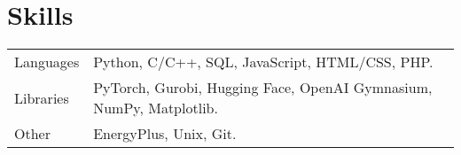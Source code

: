 \documentclass[a4paper,12pt]{article}
\begin{document}
\section{Skills}
\begin{tabularx}{\linewidth}{@{}l X@{}}
Languages & \normalsize{Python, C/C++, SQL, JavaScript, HTML/CSS, PHP.} \\ %
Libraries & \normalsize{PyTorch, Gurobi, Hugging Face, OpenAI Gymnasium, NumPy, Matplotlib.} \\ %
Other & \normalsize{EnergyPlus, Unix, Git.} \\ %
\end{tabularx}


\vfill
{}
\end{document}
